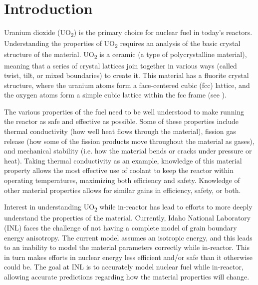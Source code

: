 \documentclass[twoside,senior]{BYUPhys}
\begin{document}
 \frontmatter

 \makepreliminarypages

 \singlespace

 \tableofcontents
 \clearemptydoublepage

 \listoffigures
 \clearemptydoublepage

 \doublespace

 \mainmatter


\chapter{Introduction\label{intro}}
Uranium dioxide (UO\textsubscript{2}) is the primary choice for nuclear fuel in today's reactors.\cite{uraniumInfo}  Understanding the properties of UO\textsubscript{2} requires an analysis of the basic crystal structure of the material.  UO\textsubscript{2} is a ceramic (a type of polycrystalline material), meaning that a series of crystal lattices join together in various ways (called twist, tilt, or mixed boundaries) to create it.  This material has a fluorite crystal structure, where the uranium atoms form a face-centered cubic (fcc) lattice, and the oxygen atoms form a simple cubic lattice within the fcc frame (see ).

The various properties of the fuel need to be well understood to make running the reactor as safe and effective as possible.  Some of these properties include thermal conductivity (how well heat flows through the material), fission gas release (how some of the fission products move throughout the material as gases), and mechanical stability (i.e. how the material bends or cracks under pressure or heat).  Taking thermal conductivity as an example, knowledge of this material property allows the most effective use of coolant to keep the reactor within operating temperatures, maximizing both efficiency and safety.  Knowledge of other material properties allows for similar gains in efficiency, safety, or both.

Interest in understanding UO\textsubscript{2} while in-reactor has lead to efforts to more deeply understand the properties of the material.  Currently, Idaho National Laboratory (INL) faces the challenge of not having a complete model of grain boundary energy anisotropy.  The current model assumes an isotropic energy, and this leads to an inability to model the material parameters correctly while in-reactor.  This in turn makes efforts in nuclear energy less efficient and/or safe than it otherwise could be.  The goal at INL is to accurately model nuclear fuel while in-reactor, allowing accurate predictions regarding how the material properties will change.
\end{document}
